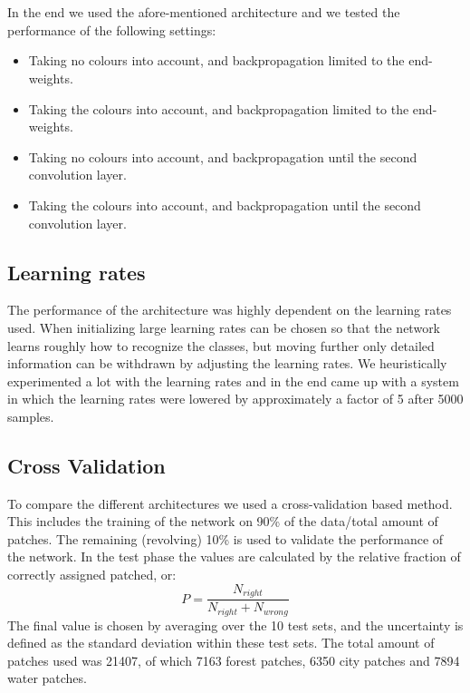 \documentclass[a4paper,onecolumn]{report}
\begin{document}
\\\\
In the end we used the afore-mentioned architecture and we tested the performance of the following settings: 
\begin{itemize}
\item Taking no colours into account, and backpropagation limited to the end-weights.
\item Taking the colours into account, and backpropagation limited to the end-weights.
\item Taking no colours into account, and backpropagation until the second convolution layer.
\item Taking the colours into account, and backpropagation until the second convolution layer. 
\end{itemize}


\subsection{Learning rates}
The performance of the architecture was highly dependent on the learning rates used. When initializing large learning rates can be chosen so that the network learns roughly how to recognize the classes, but moving further only detailed information can be withdrawn by adjusting the learning rates. We heuristically experimented a lot with the learning rates and in the end came up with a system in which the learning rates were lowered by approximately a factor of 5 after 5000 samples. 

\subsection{Cross Validation}
To compare the different architectures we used a cross-validation based method. This includes the training of the network on 90\% of the data/total amount of patches. The remaining (revolving) 10\% is used to validate the performance of the network. In the test phase the values are calculated by the relative fraction of correctly assigned patched, or: 
\begin{equation}
\label{eq:P}
P= \frac{N_{right}}{N_{right}+ N_{wrong}}
\end{equation}
The final value is chosen by averaging over the 10 test sets, and the uncertainty is defined as the standard deviation within these test sets. The total amount of patches used was 21407, of which 7163 forest patches, 6350 city patches and 7894 water patches. 
\end{document}
